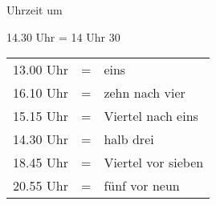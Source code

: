 \begin{semantics}{Uhrzeit}{}
um \fillhere \\

\begin{mdframed}
	14.30 Uhr = 14 Uhr 30
\end{mdframed}

\begin{mdframed}
\begin{tabular}{lll}
	13.00 Uhr & = & eins \\
	16.10 Uhr & = & zehn nach vier \\
	15.15 Uhr & = & Viertel nach eins \\
	14.30 Uhr & = & halb drei \\
	18.45 Uhr & = & Viertel vor sieben \\
	20.55 Uhr & = & fünf vor neun
\end{tabular}
\end{mdframed}
\end{semantics}
